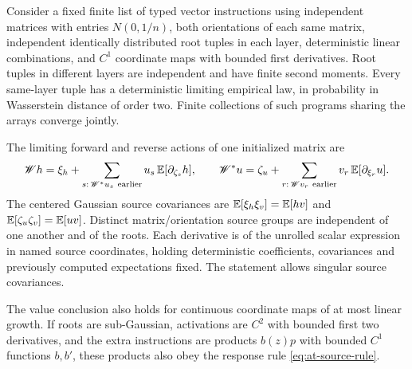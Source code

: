 \begin{lemma}
\label{lem:at-fixed-program}
Consider a fixed finite list of typed vector instructions using independent
matrices with entries $N(0,1/n)$, both orientations of each same matrix,
independent identically distributed root tuples in each layer, deterministic
linear combinations, and $C^1$ coordinate maps with bounded first derivatives.
Root tuples in different layers are independent and have finite second
moments.  Every same-layer tuple has a deterministic limiting empirical law,
in probability in Wasserstein distance of order two.  Finite collections
of such programs sharing the arrays converge jointly.

The limiting forward and reverse actions of one initialized matrix are
\begin{equation}
 \mathscr W h=\xi_h+\sum_{s:\,\mathscr W^*u_s\ {\rm earlier}}
       u_s\,\mathbb{E}[\partial_{\zeta_s}h],\qquad
 \mathscr W^*u=\zeta_u+\sum_{r:\,\mathscr Wv_r\ {\rm earlier}}
       v_r\,\mathbb{E}[\partial_{\xi_r}u].
 \label{eq:at-source-rule}
\end{equation}
The centered Gaussian source covariances are
$\mathbb{E}[\xi_h\xi_v]=\mathbb{E}[hv]$ and $\mathbb{E}[\zeta_u\zeta_v]=\mathbb{E}[uv]$.
Distinct matrix/orientation source groups are independent of one another
and of the roots.  Each derivative is of the unrolled scalar expression
in named source coordinates, holding deterministic coefficients,
covariances and previously computed expectations fixed.
The statement allows singular source covariances.

The value conclusion also holds for continuous coordinate maps of at most
linear growth.  If roots are sub-Gaussian, activations are $C^2$ with
bounded first two derivatives, and the extra instructions are products
$b(z)p$ with bounded $C^1$ functions $b,b'$, these products also obey the
response rule \eqref{eq:at-source-rule}.
\end{lemma}
